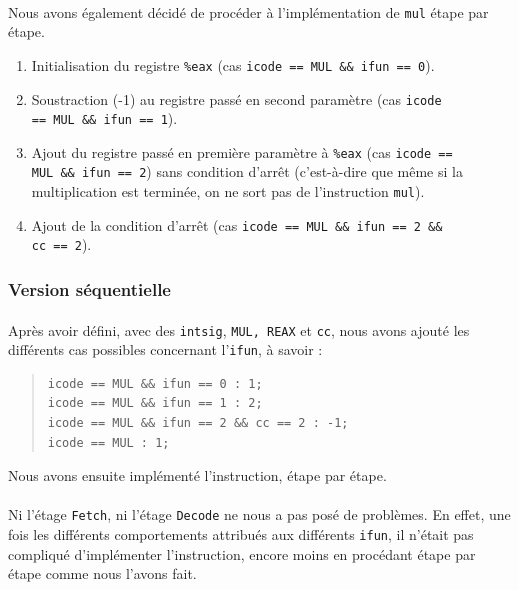 \documentclass[12pt]{article}
\begin{document}
\paragraph{}Nous avons également décidé de procéder à l'implémentation de \verb+mul+ étape par étape.
\begin{enumerate}
\item Initialisation du registre \verb+%eax+ (cas \verb+icode == MUL && ifun == 0+).
\item Soustraction (-1) au registre passé en second paramètre (cas \verb+icode+
  \\\verb+== MUL && ifun == 1+).
\item Ajout du registre passé en première paramètre à \verb+%eax+ (cas \verb+icode ==+
  \\\verb+MUL && ifun == 2+) sans condition d'arrêt (c'est-à-dire que même si la multiplication est terminée, on ne sort pas de l'instruction \verb+mul+).
\item Ajout de la condition d'arrêt (cas \verb+icode == MUL && ifun == 2 &&+
  \\\verb+cc == 2+).
\end{enumerate}

\subsubsection{Version séquentielle}
\paragraph{}Après avoir défini, avec des \verb+intsig+, \verb+MUL, REAX+ et \verb+cc+, nous avons ajouté les différents cas possibles concernant l'\verb+ifun+, à savoir :
\begin{quote}
\begin{verbatim}
icode == MUL && ifun == 0 : 1;
icode == MUL && ifun == 1 : 2;
icode == MUL && ifun == 2 && cc == 2 : -1;
icode == MUL : 1;
\end{verbatim}
\end{quote}
Nous avons ensuite implémenté l'instruction, étape par étape.

\paragraph{}Ni l'étage \verb+Fetch+, ni l'étage \verb+Decode+ ne nous a pas posé de problèmes. En effet, une fois les différents comportements attribués aux différents \verb+ifun+, il n'était pas compliqué d'implémenter l'instruction, encore moins en procédant étape par étape comme nous l'avons fait.
\end{document}
